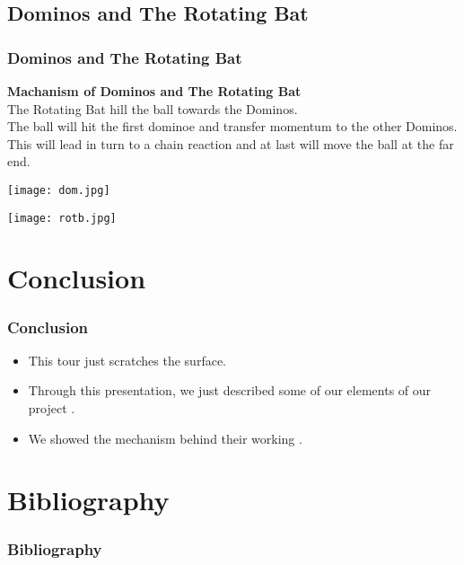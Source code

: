 \documentclass{beamer}
\begin{document}
\subsection{Dominos and The Rotating Bat}
\begin{frame}
\frametitle{Dominos and The Rotating Bat}
{\bf Machanism of Dominos and The Rotating Bat\cite{ref_3}}
\\\pause The Rotating Bat hill the ball towards the Dominos.
\\\pause The ball will hit the first dominoe and transfer momentum to the other Dominos.
\\\pause This will lead in turn to a chain reaction and at last will move the ball at the far end.

\begin{minipage}{0.4\linewidth}
\hspace{1cm}\texttt{[image: dom.jpg]}
\end{minipage}
\begin{minipage}{0.4\linewidth}
\hspace{2.5cm}\texttt{[image: rotb.jpg]}
\end{minipage}
\end{frame}




\section{Conclusion}

\begin{frame}
\frametitle{Conclusion}

\begin{itemize}

\item This tour just scratches the surface.  
\pause

\item Through this presentation, we just described some of our elements of our project .
\pause

\item We showed the mechanism behind their working .

\end{itemize}

\end{frame}

\section{Bibliography}
\begin{frame}


\frametitle{Bibliography}
\nocite{*}



\end{frame}
\end{document}
